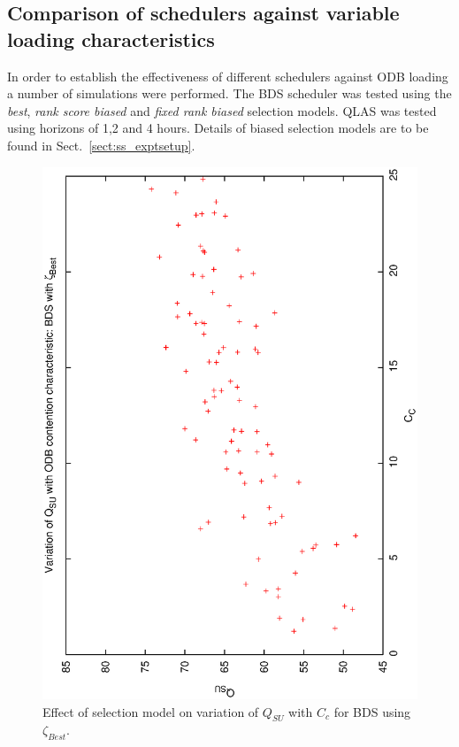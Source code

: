 \subsection{Comparison of schedulers against variable loading characteristics}
In order to establish the effectiveness of different schedulers against ODB loading a number of simulations were performed. The BDS scheduler was tested using the \emph{best}, \emph{rank score biased} and \emph{fixed rank biased} selection models. QLAS was tested using horizons of 1,2 and 4 hours. Details of biased selection models are to be found in Sect.~\ref{sect:ss_exptsetup}.

\begin{figure}[h]
 
\begin{center}
 \includegraphics[scale=0.5, angle=-90]{figures/qsucc_best.eps}
 \caption[Effect of selection model on variation of $Q_{SU}$ with $C_c$ for BDS using $\zeta_{Best}$.] 
   {Effect of selection model on variation of $Q_{SU}$ with $C_c$ for BDS using $\zeta_{Best}$.}
\label{fig:qsucc_best}
\end{center}
\end{figure}

